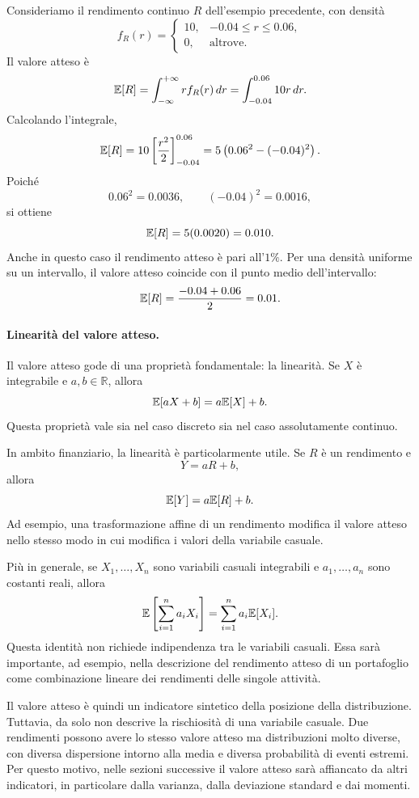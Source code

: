 \begin{example}
Consideriamo il rendimento continuo $R$ dell'esempio precedente, con densit\`{a}
\[
f_R(r)=
\begin{cases}
10, & -0.04\leq r\leq 0.06,\\
0, & \mbox{altrove}.
\end{cases}
\]
Il valore atteso \`{e}
\[
\mathbb{E}[R]
=
\int_{-\infty}^{+\infty} r f_R(r)\,dr
=
\int_{-0.04}^{0.06}10r\,dr.
\]
Calcolando l'integrale,
\[
\mathbb{E}[R]
=
10\left[\frac{r^2}{2}\right]_{-0.04}^{0.06}
=
5\left(0.06^2-(-0.04)^2\right).
\]
Poich\'{e}
\[
0.06^2=0.0036,
\qquad
(-0.04)^2=0.0016,
\]
si ottiene
\[
\mathbb{E}[R]
=
5(0.0020)
=
0.010.
\]
Anche in questo caso il rendimento atteso \`{e} pari all'$1\%$. Per una densit\`{a}
uniforme su un intervallo, il valore atteso coincide con il punto medio
dell'intervallo:
\[
\mathbb{E}[R]
=
\frac{-0.04+0.06}{2}
=
0.01.
\]
\end{example}

\paragraph{Linearit\`{a} del valore atteso.}
Il valore atteso gode di una propriet\`{a} fondamentale: la linearit\`{a}.
Se $X$ \`{e} integrabile e $a,b\in\mathbb{R}$, allora
\[
\mathbb{E}[aX+b]
=
a\mathbb{E}[X]+b.
\]
Questa propriet\`{a} vale sia nel caso discreto sia nel caso assolutamente
continuo.

In ambito finanziario, la linearit\`{a} \`{e} particolarmente utile. Se $R$ \`{e}
un rendimento e
\[
Y=aR+b,
\]
allora
\[
\mathbb{E}[Y]=a\mathbb{E}[R]+b.
\]
Ad esempio, una trasformazione affine di un rendimento modifica il valore atteso
nello stesso modo in cui modifica i valori della variabile casuale.

Pi\`{u} in generale, se $X_1,\ldots,X_n$ sono variabili casuali integrabili e
$a_1,\ldots,a_n$ sono costanti reali, allora
\[
\mathbb{E}\left[\sum_{i=1}^n a_iX_i\right]
=
\sum_{i=1}^n a_i\mathbb{E}[X_i].
\]
Questa identit\`{a} non richiede indipendenza tra le variabili casuali. Essa sar\`{a}
importante, ad esempio, nella descrizione del rendimento atteso di un portafoglio
come combinazione lineare dei rendimenti delle singole attivit\`{a}.

Il valore atteso \`{e} quindi un indicatore sintetico della posizione della
distribuzione. Tuttavia, da solo non descrive la rischiosit\`{a} di una variabile
casuale. Due rendimenti possono avere lo stesso valore atteso ma distribuzioni
molto diverse, con diversa dispersione intorno alla media e diversa probabilit\`{a}
di eventi estremi. Per questo motivo, nelle sezioni successive il valore atteso
sar\`{a} affiancato da altri indicatori, in particolare dalla varianza, dalla
deviazione standard e dai momenti.


